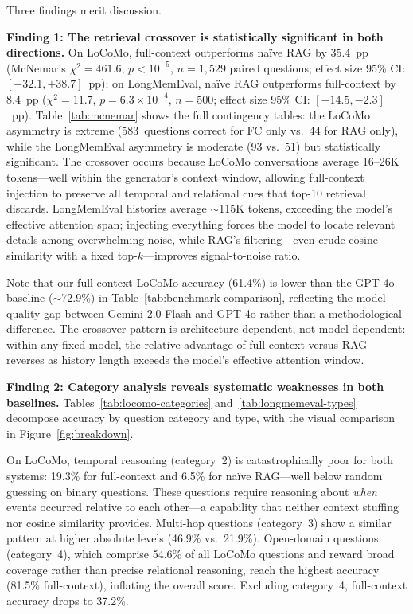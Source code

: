 Three findings merit discussion.

\smallskip
\noindent\textbf{Finding 1: The retrieval crossover is statistically
significant in both directions.}\enspace
On LoCoMo, full-context outperforms na\"ive RAG by 35.4~pp
(McNemar's $\chi^2 = 461.6$, $p < 10^{-5}$, $n = 1{,}529$ paired questions;
effect size 95\% CI: $[+32.1, +38.7]$~pp);
on LongMemEval, na\"ive RAG outperforms full-context by 8.4~pp
($\chi^2 = 11.7$, $p = 6.3 \times 10^{-4}$, $n = 500$;
effect size 95\% CI: $[-14.5, -2.3]$~pp).
Table~\ref{tab:mcnemar} shows the full contingency tables: the LoCoMo
asymmetry is extreme (583~questions correct for FC only vs.\ 44 for RAG
only), while the LongMemEval asymmetry is moderate (93 vs.\ 51) but
statistically significant.  The crossover
occurs because LoCoMo conversations average 16--26K tokens---well within the
generator's context window, allowing full-context injection to preserve all
temporal and relational cues that top-10 retrieval discards.  LongMemEval
histories average ${\sim}$115K tokens, exceeding the model's effective
attention span; injecting everything forces the model to locate relevant
details among overwhelming noise, while RAG's filtering---even crude cosine
similarity with a fixed top-$k$---improves signal-to-noise ratio.

Note that our full-context LoCoMo accuracy (61.4\%) is lower than the GPT-4o
baseline (${\sim}$72.9\%) in Table~\ref{tab:benchmark-comparison}, reflecting
the model quality gap between Gemini-2.0-Flash and GPT-4o rather than a
methodological difference.  The crossover pattern is architecture-dependent,
not model-dependent: within any fixed model, the relative advantage of
full-context versus RAG reverses as history length exceeds the model's
effective attention window.

\smallskip
\noindent\textbf{Finding 2: Category analysis reveals systematic weaknesses
in both baselines.}\enspace
Tables~\ref{tab:locomo-categories} and~\ref{tab:longmemeval-types} decompose
accuracy by question category and type, with the visual comparison in
Figure~\ref{fig:breakdown}.

On LoCoMo, temporal reasoning (category~2) is catastrophically poor for both
systems: 19.3\% for full-context and 6.5\% for na\"ive RAG---well below
random guessing on binary questions.  These questions require reasoning about
\emph{when} events occurred relative to each other---a capability that
neither context stuffing nor cosine similarity provides.  Multi-hop questions
(category~3) show a similar pattern at higher absolute levels (46.9\% vs.\
21.9\%).  Open-domain questions (category~4), which comprise 54.6\% of all
LoCoMo questions and reward broad coverage rather than precise relational
reasoning, reach the highest accuracy (81.5\% full-context), inflating the
overall score.  Excluding category~4, full-context accuracy drops to 37.2\%.


